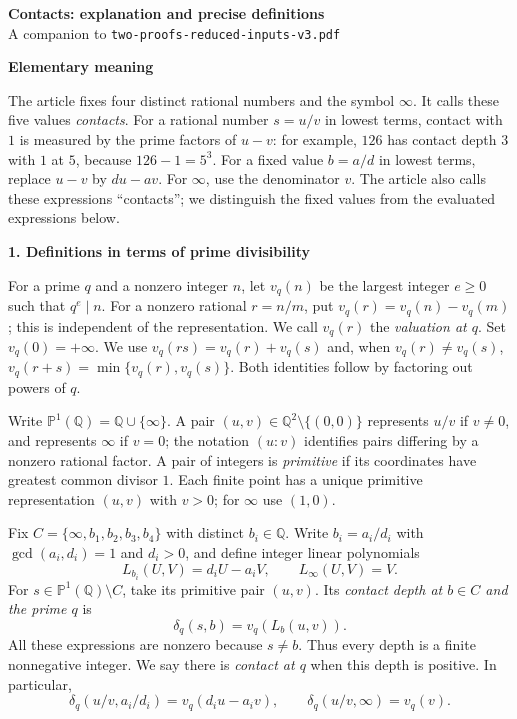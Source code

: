 \documentclass[11pt]{article}
\newcommand{\Q}{\mathbb Q}
\newcommand{\PP}{\mathbb P}
\newcommand{\heading}[1]{\vspace{4pt}\textbf{#1}\par\vspace{-3pt}}
\begin{document}
\begin{center}
{\Large\bfseries Contacts: explanation and precise definitions}\\[4pt]
{\small A companion to \texttt{two-proofs-reduced-inputs-v3.pdf}}
\end{center}
\vspace{-6pt}

\heading{Elementary meaning}
The article fixes four distinct rational numbers and the symbol $\infty$. It calls these five values \emph{contacts}. For a rational number $s=u/v$ in lowest terms, contact with $1$ is measured by the prime factors of $u-v$: for example, $126$ has contact depth $3$ with $1$ at $5$, because $126-1=5^3$. For a fixed value $b=a/d$ in lowest terms, replace $u-v$ by $du-av$. For $\infty$, use the denominator $v$. The article also calls these expressions ``contacts''; we distinguish the fixed values from the evaluated expressions below.

\heading{1. Definitions in terms of prime divisibility}
For a prime $q$ and a nonzero integer $n$, let $v_q(n)$ be the largest integer $e\ge0$ such that $q^e\mid n$. For a nonzero rational $r=n/m$, put $v_q(r)=v_q(n)-v_q(m)$; this is independent of the representation. We call $v_q(r)$ the \emph{valuation at $q$}. Set $v_q(0)=+\infty$. We use $v_q(rs)=v_q(r)+v_q(s)$ and, when $v_q(r)\ne v_q(s)$, $v_q(r+s)=\min\{v_q(r),v_q(s)\}$. Both identities follow by factoring out powers of $q$.

Write $\PP^1(\Q)=\Q\cup\{\infty\}$. A pair $(u,v)\in\Q^2\setminus\{(0,0)\}$ represents $u/v$ if $v\ne0$, and represents $\infty$ if $v=0$; the notation $(u:v)$ identifies pairs differing by a nonzero rational factor. A pair of integers is \emph{primitive} if its coordinates have greatest common divisor $1$. Each finite point has a unique primitive representation $(u,v)$ with $v>0$; for $\infty$ use $(1,0)$.

Fix $C=\{\infty,b_1,b_2,b_3,b_4\}$ with distinct $b_i\in\Q$. Write $b_i=a_i/d_i$ with $\gcd(a_i,d_i)=1$ and $d_i>0$, and define integer linear polynomials
\[
L_{b_i}(U,V)=d_iU-a_iV,\qquad L_\infty(U,V)=V.
\]
For $s\in\PP^1(\Q)\setminus C$, take its primitive pair $(u,v)$. Its \emph{contact depth at $b\in C$ and the prime $q$} is
\begin{equation}\label{depth}
\delta_q(s,b)=v_q(L_b(u,v)).
\end{equation}
All these expressions are nonzero because $s\ne b$. Thus every depth is a finite nonnegative integer. We say there is \emph{contact at $q$} when this depth is positive. In particular,
\[
\delta_q(u/v,a_i/d_i)=v_q(d_i u-a_i v),\qquad
\delta_q(u/v,\infty)=v_q(v).
\]
\end{document}
